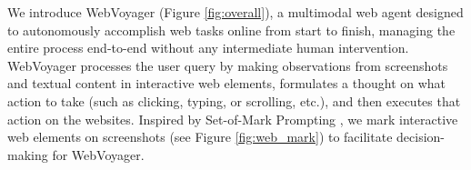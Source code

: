 \documentclass[11pt]{article}
\begin{document}
We introduce WebVoyager (Figure \ref{fig:overall}), a multimodal web agent designed to autonomously accomplish web tasks online from start to finish, managing the entire process end-to-end without any intermediate human intervention.
WebVoyager processes the user query by making observations from screenshots and textual content in interactive web elements, formulates a thought on what action to take (such as clicking, typing, or scrolling, etc.), and then executes that action on the websites.
Inspired by Set-of-Mark Prompting \citep{yang2023set}, we mark interactive web elements on screenshots (see Figure \ref{fig:web_mark}) to facilitate decision-making for WebVoyager. 
\end{document}
